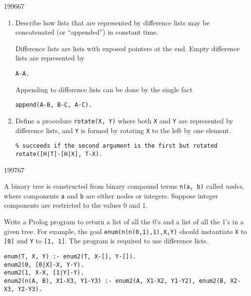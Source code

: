 \documentclass[10pt,\jkfside,a4paper]{article}
\begin{document}
\begin{examquestion}{1996}{6}{7}

\begin{enumerate}

\item Describe how lists that are represented by difference lists may be
concatenated (or ``appended'') in constant time.

Difference lists are lists with exposed pointers at the end. Empty
difference lists are represented by
\begin{lstlisting}[style=pstyle]
A-A.
\end{lstlisting}

Appending to difference lists can be done by the single fact
\begin{lstlisting}[style=pstyle]
append(A-B, B-C, A-C).
\end{lstlisting}

\item Define a procedure \texttt{rotate(X, Y)} where both \texttt{X} and
\texttt{Y} are represented by difference lists, and \texttt{Y} is formed by
rotating \texttt{X} to the left by one element.

\begin{lstlisting}[style=pstyle]
% rotate(+[H|T]-[H|X], ?T-X)
% succeeds if the second argument is the first but rotated
rotate([H|T]-[H|X], T-X).
\end{lstlisting}

\end{enumerate}

\end{examquestion}

\begin{examquestion}{1997}{6}{7}

A binary tree is constructed from binary compound terms \texttt{n(a, b)}
called \textit{nodes}, where components \texttt{a} and \texttt{b} are
either nodes or integers. Suppose integer components are restricted to the
values 0 and 1.

Write a Prolog program to return a list of all the 0's and a list of all
the 1's in a given tree. For example, the goal \texttt{enum(n(n(0,1),1),X,Y)}
should instantiate \texttt{X} to \texttt{[0]} and \texttt{Y} to \texttt{[1,
1]}. The program is required to use difference lists.

\begin{lstlisting}[style=pstyle]
enum(T, X, Y) :- enum2(T, X-[], Y-[]).
enum2(0, [0|X]-X, Y-Y).
enum2(1, X-X, [1|Y]-Y).
enum2(n(A, B), X1-X3, Y1-Y3) :- enum2(A, X1-X2, Y1-Y2), enum2(B, X2-X3, Y2-Y3).
\end{lstlisting}

\end{examquestion}
\end{document}

